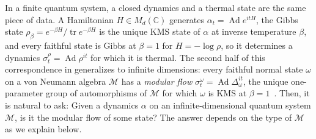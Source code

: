 \documentclass[a4paper,11pt]{article}
\theoremstyle{definition}
\newcommand{\tr}{\text{tr}}
\begin{document}


In a finite quantum system, a closed dynamics and a thermal state are the same piece of data. A Hamiltonian $H\in M_d(\mathbb C)$ generates $\alpha_t=\operatorname{Ad}e^{itH}$, the Gibbs state $\rho_\beta=e^{-\beta H}/\operatorname{tr}e^{-\beta H}$ is the unique KMS state of $\alpha$ at inverse temperature $\beta$, and every faithful state is Gibbs at $\beta=1$ for $H=-\log\rho$, so it determines a dynamics $\sigma^\rho_t=\operatorname{Ad}\rho^{it}$ for which it is thermal. The second half of this correspondence in generalizes to infinite dimensions: every faithful normal state $\omega$ on a von Neumann algebra $\mathcal M$ has a \emph{modular flow} $\sigma^\omega_t=\operatorname{Ad}\Delta_\omega^{it}$, the unique one-parameter group of automorphisms of $\mathcal M$ for which $\omega$ is KMS at $\beta=1$~\cite{Takesaki1970}. 
Then, it is natural to ask: Given a dynamics $\alpha$ on an infinite-dimensional quantum system $\mathcal M$, is it the modular flow of some state? The answer depends on the type of $\mathcal M$ as we explain below.
\end{document}
